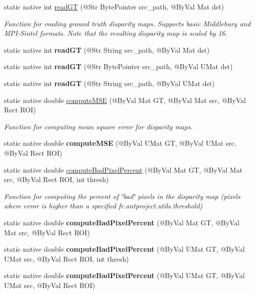 \begin{DoxyCompactItemize}
static native int \hyperlink{group__ximgproc__filters_ga98c3c9fc13d0d1e808c73c8a0ae91a09}{read\+GT} (@Str Byte\+Pointer src\+\_\+path, @By\+Val Mat dst)
\begin{DoxyCompactList}\small\item\em Function for reading ground truth disparity maps. Supports basic Middlebury and M\+P\+I-\/\+Sintel formats. Note that the resulting disparity map is scaled by 16. \end{DoxyCompactList}\item 
static native int {\bfseries read\+GT} (@Str String src\+\_\+path, @By\+Val Mat dst)
\item 
static native int {\bfseries read\+GT} (@Str Byte\+Pointer src\+\_\+path, @By\+Val U\+Mat dst)
\item 
static native int {\bfseries read\+GT} (@Str String src\+\_\+path, @By\+Val U\+Mat dst)
\item 
static native double \hyperlink{group__ximgproc__filters_ga0f224e6315d538e257cba2fb7ae0bbee}{compute\+M\+SE} (@By\+Val Mat GT, @By\+Val Mat src, @By\+Val Rect R\+OI)
\begin{DoxyCompactList}\small\item\em Function for computing mean square error for disparity maps. \end{DoxyCompactList}\item 
static native double {\bfseries compute\+M\+SE} (@By\+Val U\+Mat GT, @By\+Val U\+Mat src, @By\+Val Rect R\+OI)
\item 
static native double \hyperlink{group__ximgproc__filters_ga04b04ac57f6b8c53deacbb1d41d05766}{compute\+Bad\+Pixel\+Percent} (@By\+Val Mat GT, @By\+Val Mat src, @By\+Val Rect R\+OI, int thresh)
\begin{DoxyCompactList}\small\item\em Function for computing the percent of \char`\"{}bad\char`\"{} pixels in the disparity map (pixels where error is higher than a specified fr.antproject.utils.threshold) \end{DoxyCompactList}\item
static native double {\bfseries compute\+Bad\+Pixel\+Percent} (@By\+Val Mat GT, @By\+Val Mat src, @By\+Val Rect R\+OI)
\item 
static native double {\bfseries compute\+Bad\+Pixel\+Percent} (@By\+Val U\+Mat GT, @By\+Val U\+Mat src, @By\+Val Rect R\+OI, int thresh)
\item 
static native double {\bfseries compute\+Bad\+Pixel\+Percent} (@By\+Val U\+Mat GT, @By\+Val U\+Mat src, @By\+Val Rect R\+OI)

\end{DoxyCompactItemize}
